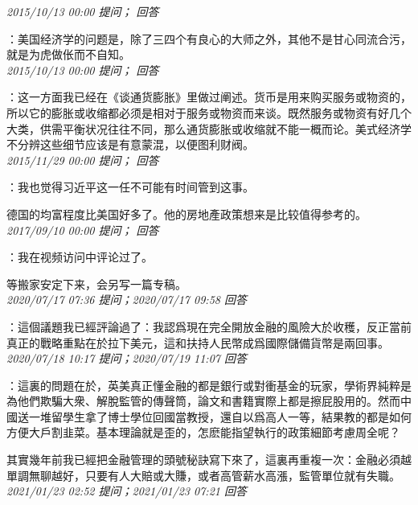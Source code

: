 \documentclass[twocolumn]{ctexart}
\begin{document}
\textit{\hfill\noindent\small 2015/10/13 00:00 提问； 回答}

：美国经济学的问题是，除了三四个有良心的大师之外，其他不是甘心同流合污，就是为虎做伥而不自知。\\

\textit{\hfill\noindent\small 2015/10/13 00:00 提问； 回答}

：这一方面我已经在《谈通货膨胀》里做过阐述。货币是用来购买服务或物资的，所以它的膨胀或收缩都必须是相对于服务或物资而来谈。既然服务或物资有好几个大类，供需平衡状况往往不同，那么通货膨胀或收缩就不能一概而论。美式经济学不分辨这些细节应该是有意蒙混，以便图利财阀。\\

\textit{\hfill\noindent\small 2015/11/29 00:00 提问； 回答}

：我也觉得习近平这一任不可能有时间管到这事。

德国的均富程度比美国好多了。他的房地產政策想来是比较值得参考的。\\

\textit{\hfill\noindent\small 2017/09/10 00:00 提问； 回答}

：我在视频访问中评论过了。

等搬家安定下来，会另写一篇专稿。\\

\textit{\hfill\noindent\small 2020/07/17 07:36 提问；2020/07/17 09:58 回答}

：這個議題我已經評論過了：我認爲現在完全開放金融的風險大於收穫，反正當前真正的戰略重點在於拉下美元，這和扶持人民幣成爲國際儲備貨幣是兩回事。
\\

\textit{\hfill\noindent\small 2020/07/18 10:17 提问；2020/07/19 11:07 回答}

：這裏的問題在於，英美真正懂金融的都是銀行或對衝基金的玩家，學術界純粹是為他們欺騙大衆、解脫監管的傳聲筒，論文和書籍實際上都是擦屁股用的。然而中國送一堆留學生拿了博士學位回國當教授，還自以爲高人一等，結果教的都是如何方便大戶割韭菜。基本理論就是歪的，怎麽能指望執行的政策細節考慮周全呢？

其實幾年前我已經把金融管理的頭號秘訣寫下來了，這裏再重複一次：金融必須越單調無聊越好，只要有人大賠或大賺，或者高管薪水高漲，監管單位就有失職。
\\

\textit{\hfill\noindent\small 2021/01/23 02:52 提问；2021/01/23 07:21 回答}
\end{document}
